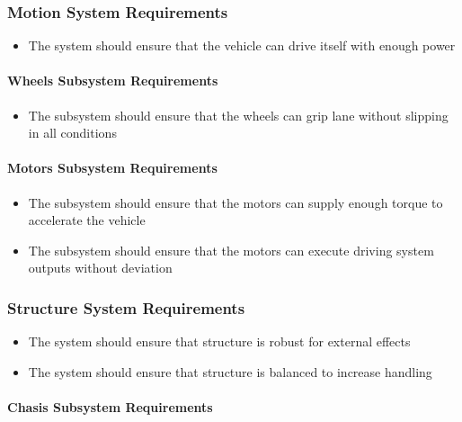 \documentclass[a4paper,12pt]{article}
\begin{document}
	\subsubsection{Motion System Requirements}
	
		\begin{itemize}
			\item The system should	ensure that the vehicle can drive itself with enough power
		\end{itemize}
	
	\paragraph{Wheels Subsystem Requirements}	
		
		\begin{itemize}
			\item The subsystem should ensure that the wheels can grip lane without slipping in all conditions 	
		\end{itemize}
		
	\paragraph{Motors Subsystem Requirements}
	
		\begin{itemize}
			\item The subsystem should ensure that the motors can supply enough torque to accelerate the vehicle		
			\item  The subsystem should ensure that the motors can execute driving system outputs without deviation 
		\end{itemize}
	
	
	\subsubsection{Structure System Requirements}
	
		\begin{itemize}
			\item The system should	ensure that structure is robust for external effects 
			\item The system should	ensure that structure is balanced to increase handling
	
		\end{itemize}
	
	\paragraph{Chasis Subsystem Requirements}	
		
\end{document}
